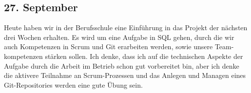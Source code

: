 \subsection{27. September}
Heute haben wir in der Berufsschule eine Einführung in das Projekt der nächsten drei Wochen erhalten. Es wird um eine Aufgabe in SQL gehen, durch die wir auch Kompetenzen in Scrum und Git erarbeiten werden, sowie unsere Team-kompetenzen stärken sollen. Ich denke, dass ich auf die technischen Aspekte der Aufgabe durch die Arbeit im Betrieb schon gut vorbereitet bin, aber ich denke die aktivere Teilnahme an Scrum-Prozessen und das Anlegen und Managen eines Git-Repositories werden eine gute Übung sein.